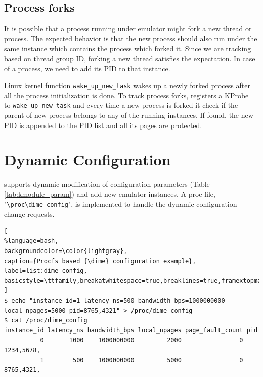 \subsection{Process forks}
It is possible that a process running under emulator might fork a new thread or process. The expected behavior is that the new process should also run under the same {\dime} instance which contains the process which forked it. Since we are tracking based on thread group ID, forking a new thread satisfies the expectation. In case of a process, we need to add its PID to that {\dime} instance.

Linux kernel function \verb|wake_up_new_task| wakes up a newly forked process after all the process initialization is done. To track process forks, {\dime} registers a KProbe~\cite{kprobe} to \verb|wake_up_new_task| and every time a new process is forked it check if the parent of new process belongs to any of the running {\dime} instances. If found, the new PID is appended to the PID list and all its pages are protected.


\section{Dynamic Configuration}
{\dime} supports dynamic modification of configuration parameters (Table \ref{tab:kmodule_param}) and add new emulator instances. A proc file, "\verb|\proc\dime_config|", is implemented to handle the dynamic configuration change requests. 

\scriptsize
\begin{lstlisting}[
%language=bash,
backgroundcolor=\color{lightgray},
caption={Procfs based {\dime} configuration example},
label=list:dime_config,
basicstyle=\ttfamily,breakatwhitespace=true,breaklines=true,framextopmargin=50pt,frame=bottomline
]
$ echo "instance_id=1 latency_ns=500 bandwidth_bps=1000000000 local_npages=5000 pid=8765,4321" > /proc/dime_config
$ cat /proc/dime_config
instance_id latency_ns bandwidth_bps local_npages page_fault_count pid
          0       1000    1000000000         2000                0 1234,5678,
          1        500    1000000000         5000                0 8765,4321,
\end{lstlisting}
\normalsize

